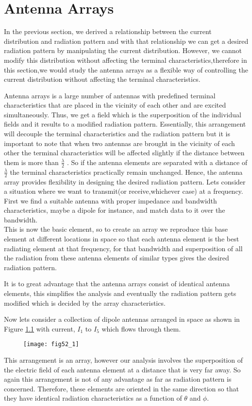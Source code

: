 \chapter{Antenna Arrays}
In the previous section, we derived a relationship between the current distribution and radiation pattern and with that relationship we can get a desired radiation pattern by manipulating the current distribution. However, we cannot modify this distribution without affecting the terminal characteristics,therefore in this section,we would study the antenna arrays as a flexible way of controlling the current distribution without affecting the terminal characteristics.

Antenna arrays is a large number of antennas with predefined terminal characteristics that are placed in the vicinity of each other and are excited simultaneously. Thus, we get a field which is the superposition of the individual fields and it results to a modified radiation pattern. Essentially, this arrangement will decouple the terminal characteristics and the radiation pattern but it is important to note that when two antennas are brought in the vicinity of each other the terminal characteristics will be affected slightly if the distance between them is more than $ \frac{\lambda}{2} $ . So if the antenna elements are separated with a distance of $ \frac{\lambda}{2} $ the terminal characteristics practically remain unchanged. Hence, the antenna array provides flexibility in designing the desired radiation pattern. Lets consider a situation where we want to transmit(or receive,whichever case) at a frequency. First we find a suitable antenna with proper impedance and bandwidth characteristics, maybe a dipole for instance, and match data to it over the bandwidth.\\This is now the basic element, so to create an array we reproduce this base element at different locations in space so that each antenna element is the best radiating element at that frequency, for that bandwidth and superposition of all the radiation from these antenna elements of similar types gives the desired radiation pattern.

It is to great advantage that the antenna arrays consist of identical antenna elements, this simplifies the analysis and eventually the radiation pattern gets modified which is decided by the array characteristics.

Now lets consider a collection of dipole antennas arranged in space as shown in Figure \ref{52.1} with current, $I_1$ to $I_5$ which flows through them.
\begin{figure}[h!]
	\texttt{[image: fig52\_1]}
	\centering
	\caption{}
	\label{52.1}
	
\end{figure}
This arrangement is an array, however our analysis involves the superposition of the electric field of each antenna element at a distance that is very far away. So again this arrangement is not of any advantage as far as radiation pattern is concerned. Therefore, these elements are oriented in the same direction so that they have identical radiation characteristics as a function of $\theta$ and $\phi$.

